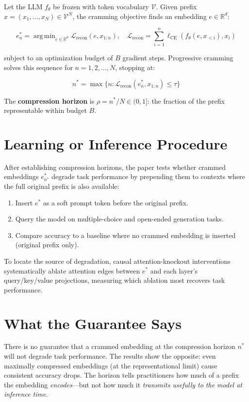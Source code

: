 \documentclass[10pt,twocolumn]{article}
\DeclareMathOperator*{\argmin}{arg\,min}
\begin{document}
Let the LLM $f_\theta$ be frozen with token vocabulary $\mathcal{V}$.
Given prefix $x = (x_1, \ldots, x_N) \in \mathcal{V}^N$, the
cramming objective finds an embedding $e \in \mathbb{R}^d$:

\[
e^*_n = \argmin_{e \in \mathbb{R}^d}
  \mathcal{L}_\text{recon}(e, x_{1:n}), \quad
\mathcal{L}_\text{recon} = \sum_{i=1}^n \ell_\mathrm{CE}(f_\theta(e, x_{<i}), x_i)
\]

subject to an optimization budget of $B$ gradient steps. Progressive
cramming solves this sequence for $n = 1, 2, \ldots, N$, stopping at:

\[
n^* = \max\{n : \mathcal{L}_\text{recon}(e^*_n, x_{1:n}) \leq \tau\}
\]

The \textbf{compression horizon} is $\rho = n^*/N \in (0, 1]$: the
fraction of the prefix representable within budget $B$.

\section{Learning or Inference Procedure}

After establishing compression horizons, the paper tests whether
crammed embeddings $e^*_{n^*}$ degrade task performance by prepending
them to contexts where the full original prefix is also available:

\begin{enumerate}[itemsep=2pt,parsep=0pt]
  \item Insert $e^*$ as a soft prompt token before the original prefix.
  \item Query the model on multiple-choice and open-ended generation tasks.
  \item Compare accuracy to a baseline where no crammed embedding
    is inserted (original prefix only).
\end{enumerate}

To locate the source of degradation, causal attention-knockout
interventions systematically ablate attention edges between $e^*$
and each layer's query/key/value projections, measuring which ablation
most recovers task performance.

\section{What the Guarantee Says}

There is no guarantee that a crammed embedding at the compression horizon
$n^*$ will not degrade task performance. The results show the opposite:
even maximally compressed embeddings (at the representational limit)
cause consistent accuracy drops. The horizon tells practitioners how
much of a prefix the embedding \emph{encodes}---but not how much it
\emph{transmits usefully to the model at inference time}.
\end{document}
